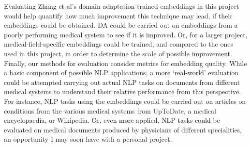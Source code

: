 \documentclass[10pt]{article}
\begin{document}
Evaluating Zhang et al's domain adaptation-trained embeddings in this project would help quantify how much improvement this technique may lead, if their embeddings could be obtained. DA could be carried out on embeddings from a poorly performing medical system to see if it is improved. Or, for a larger project, medical-field-specific embeddings could be trained, and compared to the ones used in this project, in order to determine the scale of possible improvement. Finally, our methods for evaluation consider metrics for embedding quality. While a basic component of possible NLP applications, a more `real-world' evaluation could be attempted carrying out actual NLP tasks on documents from different medical systems to understand their relative performance from this perspective. For instance, NLP tasks using the embeddings could be carried out on articles on conditions from the various medical systems from UpToDate, a medical encyclopaedia, or Wikipedia. Or, even more applied, NLP tasks could be evaluated on medical documents produced by physicians of different specialities, an opportunity I may soon have with a personal project. 



%
%



{}
\end{document}
